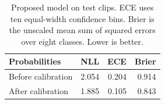 \begin{table}[t]
\centering\small
\begin{tabular}{lrrr}
\toprule
Probabilities & NLL & ECE & Brier \\
\midrule
Before calibration & 2.054 & 0.204 & 0.914 \\
After calibration & 1.885 & 0.105 & 0.843 \\
\bottomrule
\end{tabular}
\caption{Proposed model on test clips. ECE uses ten equal-width confidence bins. Brier is the unscaled mean sum of squared errors over eight classes. Lower is better.}
\label{tab:cal}
\end{table}
